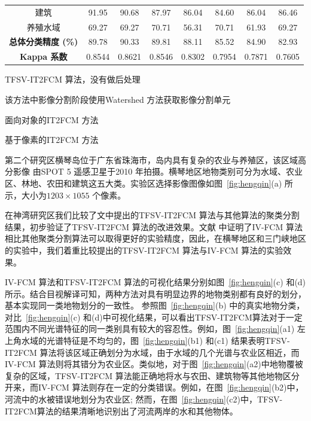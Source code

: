 \begin{table}[htbp]
{\begin{threeparttable}[b]
\begin{tabular}{cccccccc}
                建筑                       & 91.95                & 90.68             & 87.97                & 86.04  & 84.60           & 86.04           & 86.46  \\
                养殖水域                   & 69.27                & 69.27             & 70.71                & 56.31  & 70.71           & 61.93           & 69.27  \\
                \cline{1-8}
                \textbf{总体分类精度 (\%)} & 89.78                & 90.33             & 89.81                & 88.11  & 85.52           & 84.90           & 82.93  \\
                \textbf{Kappa 系数}        & 0.8544               & 0.8621            & 0.8546               & 0.8302 & 0.7954          & 0.7871          & 0.7605 \\
                \bottomrule
            \end{tabular}
            \begin{tablenotes}
                \item[1] {TFSV-IT2FCM 算法，没有做后处理}
                \item[2]{该方法中影像分割阶段使用Watershed 方法获取影像分割单元}
                \item[3]{面向对象的IT2FCM 方法}
                \item[4]{基于像素的IT2FCM 方法}
            \end{tablenotes}

        \end{threeparttable}
    }
\end{table}

第二个研究区横琴岛位于广东省珠海市，岛内具有复杂的农业与养殖区，该区域高分影像
由SPOT 5 遥感卫星于2010 年拍摄。横琴地区地物类别可分为水域、农业区、林地、农田和建筑这五大类。实验区选择影像图像如图~\ref{fig:hengqin}(a) 所示，大小为$1203 \times 1055$ 个像素。

在神湾研究区我们比较了文中提出的TFSV-IT2FCM 算法与其他算法的聚类分割结果，初步验证了TFSV-IT2FCM 算法的改进效果。文献\cite{he2016remote} 中证明了IV-FCM 算法相比其他聚类分割算法可以取得更好的实验精度，因此，在横琴地区和三门峡地区的实验中，我们着重比较提出的TFSV-IT2FCM 算法与IV-FCM 算法的实验效果。

IV-FCM 算法和TFSV-IT2FCM 算法的可视化结果分别如图~\ref{fig:hengqin}(c) 和(d) 所示。结合目视解译可知，两种方法对具有明显边界的地物类别都有良好的划分，基本实现同一类地物划分的一致性。 参照图~\ref{fig:hengqin}(b) 中的真实地物分类，对比~\ref{fig:hengqin}(c) 和(d)中可视化结果，可以看出TFSV-IT2FCM算法对于一定范围内不同光谱特征的同一类别具有较大的容忍性。例如，图~\ref{fig:hengqin}(a1) 左上角水域的光谱特征是不均匀的，图~\ref{fig:hengqin}(b1) 和(c1) 结果表明TFSV-IT2FCM 算法将该区域正确划分为水域，由于水域的几个光谱与农业区相近，而IV-FCM 算法则将其错分为农业区。类似地，对于图~\ref{fig:hengqin}(a2)中地物覆被复杂的区域，TFSV-IT2FCM 算法能正确地将水与农田、建筑物等其他地物区分开来，而IV-FCM 算法则存在一定的分类错误。例如，在图~\ref{fig:hengqin}(b2)中，河流中的水被错误地划分为农业区; 然而，在图~\ref{fig:hengqin}(c2)中，TFSV-IT2FCM算法的结果清晰地识别出了河流两岸的水和其他物体。




